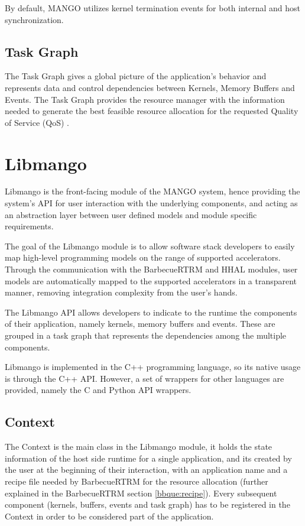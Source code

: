 By default, MANGO utilizes kernel termination events for both internal and host synchronization.

\subsection{Task Graph} \label{arch:TaskGraph}

The Task Graph gives a global picture of the application's behavior and represents data and control dependencies between Kernels, Memory Buffers and Events. The Task Graph provides the resource manager with the information needed to generate the best feasible resource allocation for the requested Quality of Service (QoS) \cite{mango_exploring_manycore_architectures}.


\section{Libmango}
Libmango is the front-facing module of the MANGO system, hence providing the system's API for user interaction with the underlying components, and acting as an abstraction layer between user defined models and module specific requirements.

The goal of the Libmango module is to allow software stack developers to easily map high-level programming models on the range of supported accelerators. Through the communication with the BarbecueRTRM and HHAL modules, user models are automatically mapped to the supported accelerators in a transparent manner, removing integration complexity from the user's hands.

The Libmango API allows developers to indicate to the runtime the components of their application, namely kernels, memory buffers and events. These are grouped in a task graph that represents the dependencies among the multiple components. 

Libmango is implemented in the C++ programming language, so its native usage is through the C++ API. However, a set of wrappers for other languages are provided, namely the C and Python API wrappers.

\subsection{Context}
The Context is the main class in the Libmango module, it holds the state information of the host side runtime for a single application, and its created by the user at the beginning of their interaction, with an application name and a recipe file needed by BarbecueRTRM for the resource allocation (further explained in the BarbecueRTRM section \ref{bbque:recipe}). Every subsequent component (kernels, buffers, events and task graph) has to be registered in the Context in order to be considered part of the application.

